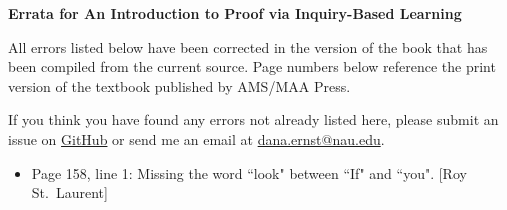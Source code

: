 \documentclass[11pt]{amsart}
\begin{document}
\begin{center}
\Large\textbf{Errata for An Introduction to Proof via Inquiry-Based Learning}
\end{center}

\bigskip

\noindent All errors listed below have been corrected in the version of the book that has been compiled from the current source.  Page numbers below reference the print version of the textbook published by AMS/MAA Press.

\bigskip

\noindent If you think you have found any errors not already listed here, please submit an issue on \href{https://github.com/dcernst/IBL-IntroToProof/issues}{GitHub} or send me an email at \url{dana.ernst@nau.edu}.

\bigskip

\begin{itemize}
\item Page 158, line 1: Missing the word ``look" between ``If" and ``you". [Roy St.~Laurent]
\end{itemize}
\end{document}

